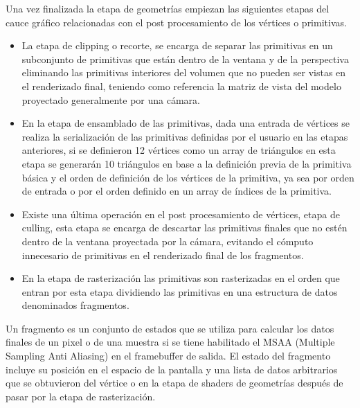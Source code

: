\documentclass[a4paper, 17pt]{book}
\begin{document}
Una vez finalizada la etapa de geometrías empiezan las siguientes etapas del cauce gráfico relacionadas con el post procesamiento
de los vértices o primitivas.

\begin{itemize}
  \item La etapa de clipping o recorte, se encarga de separar las primitivas en un subconjunto de primitivas que están dentro de la
  ventana y de la perspectiva eliminando las primitivas interiores del volumen que no pueden ser vistas en el renderizado final,
  teniendo como referencia la matriz de vista del modelo proyectado generalmente por una cámara.
  
  \item En la etapa de ensamblado de las primitivas, dada una entrada de vértices se realiza la serialización de las primitivas
  definidas por el usuario en las etapas anteriores, si se definieron 12 vértices como un array de triángulos en esta etapa se
  generarán 10 triángulos en base a la definición previa de la primitiva básica y el orden de definición de los vértices de la
  primitiva, ya sea por orden de entrada o por el orden definido en un array de índices de la primitiva.

  \item Existe una última operación en el post procesamiento de vértices, etapa de culling, esta etapa se encarga de descartar las
  primitivas finales que no estén dentro de la ventana proyectada por la cámara, evitando el cómputo innecesario de primitivas en
  el renderizado final de los fragmentos.

  \item En la etapa de rasterización las primitivas son rasterizadas en el orden que entran por esta etapa dividiendo las primitivas
  en una estructura de datos denominados fragmentos.
\end{itemize}

Un fragmento es un conjunto de estados que se utiliza para calcular los datos finales de un pixel o de una muestra si se tiene
habilitado el MSAA (Multiple Sampling Anti Aliasing) en el framebuffer de salida. El estado del fragmento incluye su posición
en el espacio de la pantalla y una lista de datos arbitrarios que se obtuvieron del vértice o en la etapa de shaders de geometrías
después de pasar por la etapa de rasterización.
\end{document}
